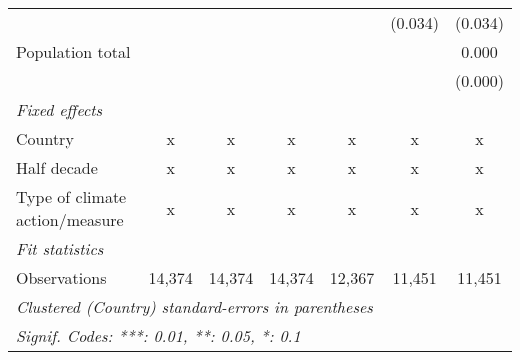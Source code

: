 \begin{tabular}{lcccccc}
                                                            &         &         &         &         & (0.034) & (0.034)\\   
   Population total                                         &         &         &         &         &         & 0.000\\   
                                                            &         &         &         &         &         & (0.000)\\   
   \emph{Fixed effects}\\
   Country                                                  & x       & x       & x       & x       & x       & x\\  
   Half decade                                              & x       & x       & x       & x       & x       & x\\  
   Type of climate action/measure                           & x       & x       & x       & x       & x       & x\\  
   \midrule \emph{Fit statistics}\\
   Observations                                             & 14,374  & 14,374  & 14,374  & 12,367  & 11,451  & 11,451\\  
   \midrule
   \multicolumn{7}{l}{\emph{Clustered (Country) standard-errors in parentheses}}\\
   \multicolumn{7}{l}{\emph{Signif. Codes: ***: 0.01, **: 0.05, *: 0.1}}\\
\end{tabular}
\par\endgroup



